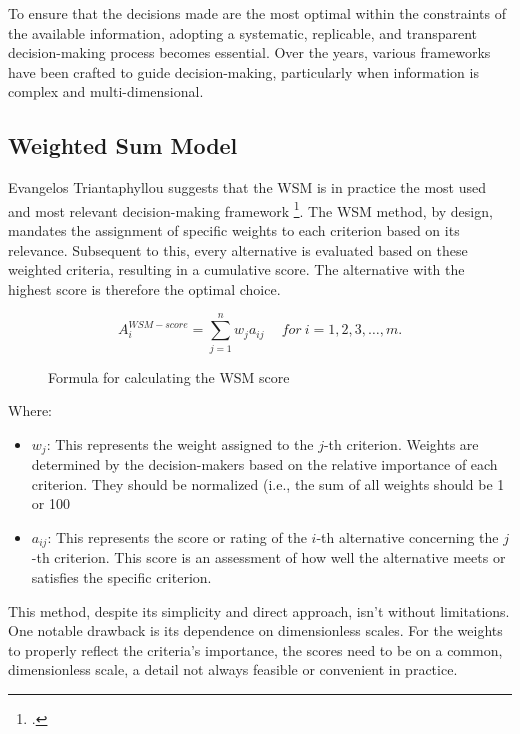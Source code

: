 To ensure that the decisions made are the most optimal within the constraints of the available information, adopting a systematic, replicable, and transparent decision-making process becomes essential. Over the years, various frameworks have been crafted to guide decision-making, 
particularly when information is complex and multi-dimensional.

\subsection{Weighted Sum Model}
Evangelos Triantaphyllou suggests that the \ac{WSM} is in practice the most used and most relevant decision-making framework \footcite[p. 1]{triantaphyllouIntroductionMultiCriteriaDecision2000}.
The \ac{WSM} method, by design, mandates the assignment of specific weights to each criterion based on its relevance. Subsequent to this, every alternative is evaluated based on these weighted criteria, resulting in a cumulative score.
The alternative with the highest score is therefore the optimal choice.


\begin{figure}[h]
    \centering
    \Large
    \[ A_{i}^{WSM-score} = \sum_{j=1}^{n} w_{j} a_{ij} \quad \ for \ i = 1, 2, 3, \dots, m. \]
    \caption{Formula for calculating the \ac*{WSM} score\protect\footnotemark} 
\end{figure}

Where:
\begin{itemize}
    \item \(w_{j}\): This represents the weight assigned to the \(j\)-th criterion. Weights are determined by the decision-makers based on the relative importance of each criterion. They should be normalized (i.e., the sum of all weights should be 1 or 100%
    
    \item \(a_{ij}\): This represents the score or rating of the \(i\)-th alternative concerning the \(j\)-th criterion. This score is an assessment of how well the alternative meets or satisfies the specific criterion. 
    \end{itemize}

This method, despite its simplicity and direct approach, isn't without limitations.
One notable drawback is its dependence on dimensionless scales.
For the weights to properly reflect the criteria's importance, the scores need to be on a common, dimensionless scale, a detail not always feasible or convenient in practice.

